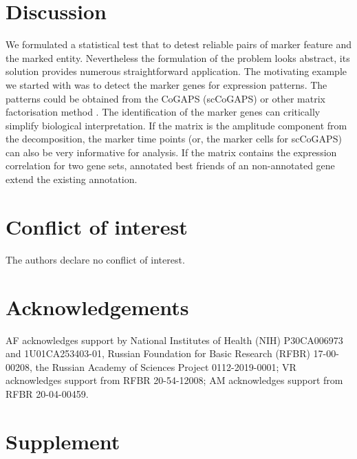 \documentclass{llncs}
\begin{document}
\section{Discussion}

We formulated a statistical test that to detest reliable pairs of marker feature and the marked entity. Nevertheless the formulation of the problem looks abstract, its solution provides numerous straightforward application. The motivating example we started with was to detect the marker genes for expression patterns. The patterns could be obtained from the CoGAPS (scCoGAPS) \cite{Fertig_2016} or other matrix factorisation method \cite{Stein_2018}. The identification of the marker genes can critically simplify biological interpretation. If the matrix is the amplitude component from  the decomposition, the marker time points (or, the marker cells for scCoGAPS) can also be very informative for analysis. If the matrix contains the expression correlation for two gene sets, annotated best friends of an non-annotated gene extend the existing annotation.

\section{Conflict of interest}
The authors declare no conflict of interest.

\section{Acknowledgements}
AF acknowledges support by National Institutes of Health (NIH) P30CA006973 and 1U01CA253403-01, Russian Foundation for Basic Research (RFBR) 17-00-00208, the Russian Academy of Sciences Project 0112-2019-0001; VR acknowledges support from RFBR 20-54-12008; AM acknowledges support from RFBR 20-04-00459.





\newcommand{\beginsupplement}{%
        \setcounter{table}{0}
        \renewcommand{\thetable}{S\arabic{table}}%
        \setcounter{figure}{0}
        \renewcommand{\thefigure}{S\arabic{figure}}
        \setcounter{equation}{0}
        \renewcommand{\theequation}{S\arabic{equation}}%
     }
\section*{Supplement}
\beginsupplement
\end{document}
